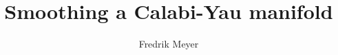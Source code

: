 \documentclass[]{uiophd}
\begin{document}
\title{Smoothing a Calabi-Yau manifold}
\author{Fredrik Meyer}
\maketitle 






\printbibliography
\end{document}
